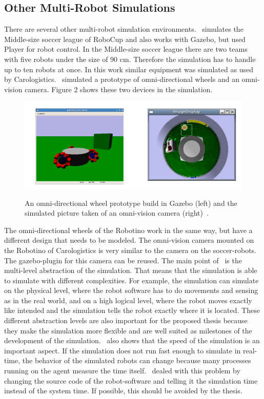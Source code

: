 \documentclass[11pt,a4paper,titlepage]{article}
\begin{document}
\subsection{Other Multi-Robot Simulations}
There are several other multi-robot simulation environments. \cite{MultiLevelAbstraction}~simulates the Middle-size soccer league of RoboCup and also works with Gazebo, but used Player for robot control. In the Middle-size soccer league there are two teams with five robots under the size of 90 cm. Therefore the simulation has to handle up to ten robots at once. In this work similar equipment was simulated as used by Carologistics. \cite{MultiLevelAbstraction}~simulated a prototype of omni-directional wheels and an omni-vision camera. Figure 2 shows these two devices in the simulation.
\begin{figure}
\includegraphics[scale=0.5]{pics/GazeboEquipment}
\label{Figure 2}
\caption{An omni-directional wheel prototype build in Gazebo (left) and the simulated picture taken of an omni-vision camera (right)~\cite{MultiLevelAbstraction}.}
\end{figure}
The omni-directional wheels of the Robotino work in the same way, but have a different design that needs to be modeled. The omni-vision camera mounted on the Robotino of Carologistics is very similar to the camera on the soccer-robots. The gazebo-plugin for this camera can be reused. The main point of~\cite{MultiLevelAbstraction} is the multi-level abstraction of the simulation. That means that the simulation is able to simulate with different complexities. For example, the simulation can simulate on the physical level, where the robot software has to do movements and sensing as in the real world, and on a high logical level, where the robot moves exactly like intended and the simulation tells the robot exactly where it is located. These different abstraction levels are also important for the proposed thesis because they make the simulation more flexible and are well suited as milestones of the development of the simulation. \cite{MultiLevelAbstraction}~also shows that the speed of the simulation is an important aspect. If the simulation does not run fast enough to simulate in real-time, the behavior of the simulated robots can change because many processes running on the agent measure the time itself. \cite{MultiLevelAbstraction}~dealed with this problem by changing the source code of the robot-software and telling it the simulation time instead of the system time. If possible, this should be avoided by the thesis.\\
\end{document}
